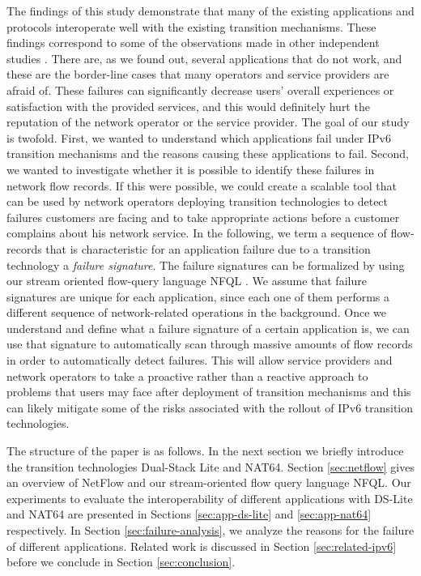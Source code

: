 \documentclass{llncs}
\begin{document}
The findings of this study demonstrate that many of the existing applications and protocols interoperate well with the existing transition mechanisms. These findings correspond to some of the observations made in other independent studies \cite{ARKKO, UENO, citeulike:9731000}. There are, as we found out, several applications that do not work, and these are the border-line cases that many operators and service providers are afraid of. These failures can significantly decrease users' overall experiences or satisfaction with the provided services, and this would definitely hurt the reputation of the network operator or the service provider. The goal of our study is twofold. First, we wanted to understand which applications fail under IPv6 transition mechanisms and the reasons causing these applications to fail. Second, we wanted to investigate whether it is possible to identify these failures in network flow records. If this were possible, we could create a scalable tool that can be used by network operators deploying transition technologies to detect failures customers are facing and to take appropriate actions before a customer complains about his network service. In the following, we term a sequence of flow-records that is characteristic for an application failure due to a transition technology a \emph{failure signature}. The failure signatures can be formalized by using our stream oriented flow-query language NFQL \cite{MARINOV, AIMS2010}. We assume that failure signatures are unique for each application, since each one of them performs a different sequence of network-related operations in the background. Once we understand and define what a failure signature of a certain application is, we can use that signature to automatically scan through massive amounts of flow records in order to automatically detect failures. This will allow service providers and network operators to take a proactive rather than a reactive approach to problems that users may face after deployment of transition mechanisms and this can likely mitigate some of the risks associated with the rollout of IPv6 transition technologies.

The structure of the paper is as follows. In the next section we
briefly introduce the transition technologies Dual-Stack Lite and NAT64. Section \ref{sec:netflow} gives an overview of NetFlow and our stream-oriented flow query language NFQL. Our experiments to evaluate the interoperability of different applications with DS-Lite and NAT64 are presented in Sections \ref{sec:app-ds-lite} and \ref{sec:app-nat64} respectively. In Section \ref{sec:failure-analysis}, we analyze the reasons for the failure of different applications. Related work is discussed in Section \ref{sec:related-ipv6} before we conclude in Section \ref{sec:conclusion}.
\end{document}
